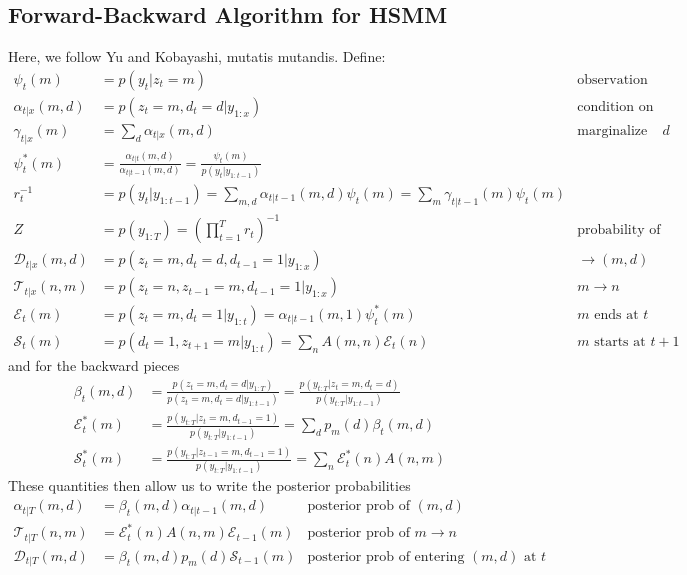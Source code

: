 \documentclass[11pt]{article}
\begin{document}
\subsection{Forward-Backward Algorithm for HSMM}
Here, we follow Yu and Kobayashi, mutatis mutandis. Define:
\begin{align*}
    \psi_t(m) &= p(y_t|z_t=m) &\text{observation probability}\\
    \alpha_{t|x}(m, d) &= p(z_t=m, d_t=d|y_{1:x}) &\text{condition on data}\\
    \gamma_{t|x}(m) &= \sum_d \alpha_{t|x} (m, d) &\text{marginalize out }d\\
    \psi^*_t(m) &= \frac{\alpha_{t|t}(m, d)}{\alpha_{t|t-1}(m, d)} =
    \frac{\psi_t(m)}{p(y_t|y_{1:t-1})} \\
    r_t^{-1} &= p(y_t|y_{1:t-1}) = \sum_{m,d} \alpha_{t|t-1}(m, d)\psi_t(m)
    = \sum_m \gamma_{t|t-1}(m) \psi_t(m)\\
    Z &= p(y_{1:T}) = \left(\prod_{t=1}^T r_t\right)^{-1} &\text{probability of data} \\
    \mathcal{D}_{t|x}(m, d) &= p(z_t=m, d_t=d, d_{t-1}=1|y_{1:x}) &\rightarrow (m, d) \\
    \mathcal{T}_{t|x}(n, m) &= p(z_t=n, z_{t-1}=m, d_{t-1}=1|y_{1:x}) &m \rightarrow n \\
    \mathcal{E}_t(m) &= p(z_t=m, d_t=1|y_{1:t}) = \alpha_{t|t-1}(m, 1) \psi^*_t(m) &m \text{ ends at } t \\
    \mathcal{S}_t(m) &= p(d_t=1, z_{t+1}=m|y_{1:t}) = \sum_n A(m, n)\mathcal{E}_t(n) &m \text{ starts at } t+1
\end{align*}
and for the backward pieces
\begin{align*}
    \beta_t(m, d) &= \frac{p(z_t=m, d_t=d|y_{1:T})}{p(z_t=m, d_t=d|y_{1:t-1})}
    = \frac{p(y_{t:T}|z_t=m, d_t=d)}{p(y_{t:T}|y_{1:t-1})} \\
    \mathcal{E}^*_t(m) &= \frac{p(y_{t:T}|z_t=m, d_{t-1} = 1)}{p(y_{t:T}|y_{1:t-1})} = \sum_d p_m(d) \beta_t(m, d) \\
    \mathcal{S}^*_t(m) &= \frac{p(y_{t:T}|z_{t-1}=m, d_{t-1}=1)}{p(y_{t:T}|y_{1:t-1})} = \sum_n \mathcal{E}^*_t(n) A(n, m)
\end{align*}
These quantities then allow us to write the posterior probabilities
\begin{align*}
    \alpha_{t|T}(m, d) &= \beta_t(m, d) \alpha_{t|t-1}(m, d) &\text{posterior prob of }(m, d) \\
    \mathcal{T}_{t|T}(n, m) &= \mathcal{E}^*_t(n) A(n, m) \mathcal{E}_{t - 1}(m) &\text{posterior prob of } m \rightarrow n \\
    \mathcal{D}_{t|T}(m, d) &= \beta_t(m, d)p_m(d) \mathcal{S}_{t-1}(m) &\text{posterior prob of entering }(m, d) \text{ at } t
\end{align*}
\end{document}
